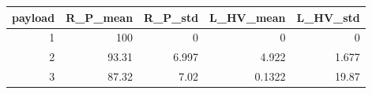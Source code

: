 \begin{tabular}{rrrrr}
\toprule
payload & R_P_mean & R_P_std & L_HV_mean & L_HV_std \\
\midrule
1 & 100 & 0 & 0 & 0 \\
2 & 93.31 & 6.997 & 4.922 & 1.677 \\
3 & 87.32 & 7.02 & 0.1322 & 19.87 \\
\bottomrule
\end{tabular}
